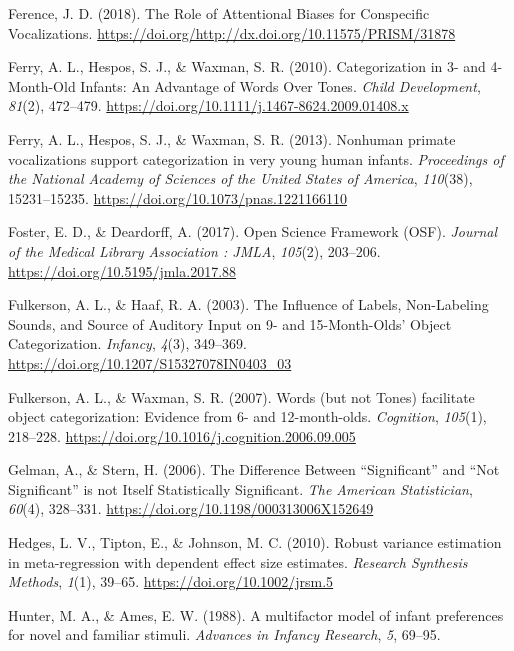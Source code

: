 \documentclass[man]{apa6}
\begin{document}
\leavevmode\hypertarget{ref-ference_role_2018}{}%
Ference, J. D. (2018). The Role of Attentional Biases for Conspecific Vocalizations. \url{https://doi.org/http://dx.doi.org/10.11575/PRISM/31878}

\leavevmode\hypertarget{ref-ferry_categorization_2010}{}%
Ferry, A. L., Hespos, S. J., \& Waxman, S. R. (2010). Categorization in 3- and 4-Month-Old Infants: An Advantage of Words Over Tones. \emph{Child Development}, \emph{81}(2), 472--479. \url{https://doi.org/10.1111/j.1467-8624.2009.01408.x}

\leavevmode\hypertarget{ref-ferry_nonhuman_2013}{}%
Ferry, A. L., Hespos, S. J., \& Waxman, S. R. (2013). Nonhuman primate vocalizations support categorization in very young human infants. \emph{Proceedings of the National Academy of Sciences of the United States of America}, \emph{110}(38), 15231--15235. \url{https://doi.org/10.1073/pnas.1221166110}

\leavevmode\hypertarget{ref-foster_open_2017}{}%
Foster, E. D., \& Deardorff, A. (2017). Open Science Framework (OSF). \emph{Journal of the Medical Library Association : JMLA}, \emph{105}(2), 203--206. \url{https://doi.org/10.5195/jmla.2017.88}

\leavevmode\hypertarget{ref-fulkerson_influence_2003}{}%
Fulkerson, A. L., \& Haaf, R. A. (2003). The Influence of Labels, Non-Labeling Sounds, and Source of Auditory Input on 9- and 15-Month-Olds' Object Categorization. \emph{Infancy}, \emph{4}(3), 349--369. \url{https://doi.org/10.1207/S15327078IN0403_03}

\leavevmode\hypertarget{ref-fulkerson_words_2007}{}%
Fulkerson, A. L., \& Waxman, S. R. (2007). Words (but not Tones) facilitate object categorization: Evidence from 6- and 12-month-olds. \emph{Cognition}, \emph{105}(1), 218--228. \url{https://doi.org/10.1016/j.cognition.2006.09.005}

\leavevmode\hypertarget{ref-gelman_difference_2006}{}%
Gelman, A., \& Stern, H. (2006). The Difference Between ``Significant'' and ``Not Significant'' is not Itself Statistically Significant. \emph{The American Statistician}, \emph{60}(4), 328--331. \url{https://doi.org/10.1198/000313006X152649}

\leavevmode\hypertarget{ref-hedges_robust_2010}{}%
Hedges, L. V., Tipton, E., \& Johnson, M. C. (2010). Robust variance estimation in meta-regression with dependent effect size estimates. \emph{Research Synthesis Methods}, \emph{1}(1), 39--65. \url{https://doi.org/10.1002/jrsm.5}

\leavevmode\hypertarget{ref-hunter_multifactor_1988}{}%
Hunter, M. A., \& Ames, E. W. (1988). A multifactor model of infant preferences for novel and familiar stimuli. \emph{Advances in Infancy Research}, \emph{5}, 69--95.
\end{document}
